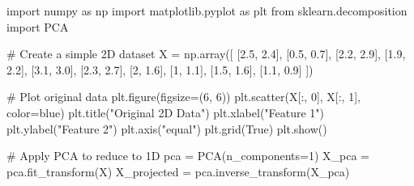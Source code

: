 \documentclass[
  letterpaper,
  DIV=11,
  numbers=noendperiod]{scrreprt}
\newenvironment{Shaded}{\begin{snugshade}}{\end{snugshade}}
\newcommand{\CommentTok}[1]{\textcolor[rgb]{0.37,0.37,0.37}{#1}}
\newcommand{\DecValTok}[1]{\textcolor[rgb]{0.68,0.00,0.00}{#1}}
\newcommand{\FloatTok}[1]{\textcolor[rgb]{0.68,0.00,0.00}{#1}}
\newcommand{\ImportTok}[1]{\textcolor[rgb]{0.00,0.46,0.62}{#1}}
\newcommand{\NormalTok}[1]{\textcolor[rgb]{0.00,0.23,0.31}{#1}}
\newcommand{\OperatorTok}[1]{\textcolor[rgb]{0.37,0.37,0.37}{#1}}
\newcommand{\StringTok}[1]{\textcolor[rgb]{0.13,0.47,0.30}{#1}}
\newcommand{\VariableTok}[1]{\textcolor[rgb]{0.07,0.07,0.07}{#1}}
\begin{document}
\begin{Shaded}
\begin{Highlighting}[]
\ImportTok{import}\NormalTok{ numpy }\ImportTok{as}\NormalTok{ np}
\ImportTok{import}\NormalTok{ matplotlib.pyplot }\ImportTok{as}\NormalTok{ plt}
\ImportTok{from}\NormalTok{ sklearn.decomposition }\ImportTok{import}\NormalTok{ PCA}

\CommentTok{\# Create a simple 2D dataset}
\NormalTok{X }\OperatorTok{=}\NormalTok{ np.array([}
\NormalTok{    [}\FloatTok{2.5}\NormalTok{, }\FloatTok{2.4}\NormalTok{],}
\NormalTok{    [}\FloatTok{0.5}\NormalTok{, }\FloatTok{0.7}\NormalTok{],}
\NormalTok{    [}\FloatTok{2.2}\NormalTok{, }\FloatTok{2.9}\NormalTok{],}
\NormalTok{    [}\FloatTok{1.9}\NormalTok{, }\FloatTok{2.2}\NormalTok{],}
\NormalTok{    [}\FloatTok{3.1}\NormalTok{, }\FloatTok{3.0}\NormalTok{],}
\NormalTok{    [}\FloatTok{2.3}\NormalTok{, }\FloatTok{2.7}\NormalTok{],}
\NormalTok{    [}\DecValTok{2}\NormalTok{, }\FloatTok{1.6}\NormalTok{],}
\NormalTok{    [}\DecValTok{1}\NormalTok{, }\FloatTok{1.1}\NormalTok{],}
\NormalTok{    [}\FloatTok{1.5}\NormalTok{, }\FloatTok{1.6}\NormalTok{],}
\NormalTok{    [}\FloatTok{1.1}\NormalTok{, }\FloatTok{0.9}\NormalTok{]}
\NormalTok{])}

\CommentTok{\# Plot original data}
\NormalTok{plt.figure(figsize}\OperatorTok{=}\NormalTok{(}\DecValTok{6}\NormalTok{, }\DecValTok{6}\NormalTok{))}
\NormalTok{plt.scatter(X[:, }\DecValTok{0}\NormalTok{], X[:, }\DecValTok{1}\NormalTok{], color}\OperatorTok{=}\StringTok{\textquotesingle{}blue\textquotesingle{}}\NormalTok{)}
\NormalTok{plt.title(}\StringTok{"Original 2D Data"}\NormalTok{)}
\NormalTok{plt.xlabel(}\StringTok{"Feature 1"}\NormalTok{)}
\NormalTok{plt.ylabel(}\StringTok{"Feature 2"}\NormalTok{)}
\NormalTok{plt.axis(}\StringTok{"equal"}\NormalTok{)}
\NormalTok{plt.grid(}\VariableTok{True}\NormalTok{)}
\NormalTok{plt.show()}

\CommentTok{\# Apply PCA to reduce to 1D}
\NormalTok{pca }\OperatorTok{=}\NormalTok{ PCA(n\_components}\OperatorTok{=}\DecValTok{1}\NormalTok{)}
\NormalTok{X\_pca }\OperatorTok{=}\NormalTok{ pca.fit\_transform(X)}
\NormalTok{X\_projected }\OperatorTok{=}\NormalTok{ pca.inverse\_transform(X\_pca)}


\end{Highlighting}
\end{Shaded}
\end{document}
